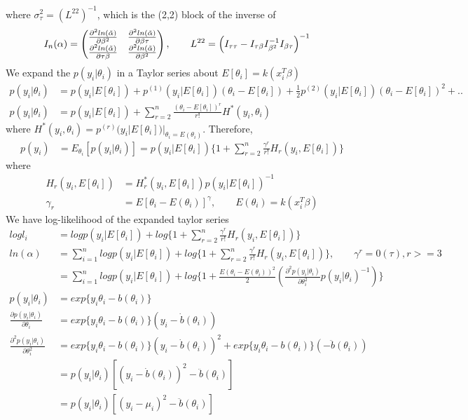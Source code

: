 \documentclass[11pt]{article} %
\begin{document}
where $\sigma^2_{\tau} = (L^{22})^{-1}$, which is the (2,2) block of the inverse of
\begin{align*}
	I_n(\alpha) &=  \begin{pmatrix}
		\frac{\partial^2 ln(\Tilde{\alpha})}{\partial \beta^2} & \frac{\partial^2 ln(\Tilde{\alpha})}{\partial \beta \tau}  \\
		\frac{\partial^2 ln(\Tilde{\alpha})}{\partial \tau \beta} & \frac{\partial^2 ln(\Tilde{\alpha})}{\partial \beta^2}  \\
	\end{pmatrix}, \qquad L^{22} =\left( I_{\tau \tau} - I_{\tau \beta} I_{\beta^2}^{-1} I_{\beta \tau}\right)^{-1}
\end{align*} 
We expand the $p(y_i|\theta_i)$ in a Taylor series about $E[\theta_i] = k(x_i^T\beta)$
\begin{align*}
	p(y_i|\theta_i)  &= p(y_i|E[\theta_i]) + p^{(1)}(y_i|E[\theta_i]) (\theta_i- E[\theta_i]) + \frac{1}{2} p^{(2)}(y_i|E[\theta_i]) (\theta_i- E[\theta_i])^2 +..\\
	p(y_i|\theta_i)  &= p(y_i|E[\theta_i]) + \sum_{r=2}^n \frac{(\theta_i- E[\theta_i])^r}{r!} H^{\ast}(y_i, \theta_i) 
\end{align*} 
where $H^{\ast}(y_i, \theta_i) = p^{(r)}(y_i|E[\theta_i])|_{\theta_i= E(\theta_i)}$.
Therefore,
\begin{align*}
	p(y_i)  &= E_{\theta_i}[p(y_i|\theta_i)] 
	= p(y_i|E[\theta_i]) \{1 + \sum_{r=2}^n \frac{\gamma^r}{r!} H_r(y_i, E[\theta_i]) \}
\end{align*} 
where 
\begin{align*}
	H_r(y_i, E[\theta_i]) & =H^{\ast}_r(y_i, E[\theta_i]) p(y_i|E[\theta_i])^{-1}\\
	\gamma_r &= E[\theta_i - E(\theta_i)]^{\gamma}, \qquad E(\theta_i) = k(x_i^T\beta)
\end{align*}
We have log-likelihood of the expanded taylor series
\begin{align*}
	log l_i & = log p(y_i|E[\theta_i]) + log  \{1 + \sum_{r=2}^n \frac{\gamma^r}{r!} H_r(y_i, E[\theta_i]) \}\\
	ln(\alpha) &= \sum_{i=1}^n log p(y_i|E[\theta_i]) + log  \{1 + \sum_{r=2}^n \frac{\gamma^r}{r!} H_r(y_i, E[\theta_i]) \}, \qquad \gamma^r = 0(\tau), r>=3\\
	&= \sum_{i=1}^n log p(y_i|E[\theta_i]) + log  \{1 + \frac{E(\theta_i-E(\theta_i))^2}{2} \left( \frac{\partial^2 p(y_i|\theta_i)}{\partial \theta_i^2} p(y_i|\theta_i)^{-1}\right)\}\\
	p(y_i|\theta_i) &= exp\{ y_i \theta_i - b(\theta_i)\}\\
	\frac{\partial p(y_i|\theta_i)}{\partial \theta_i} &= exp\{ y_i \theta_i - b(\theta_i)\} (y_i- \dot{b}(\theta_i))\\
	\frac{\partial^2 p(y_i|\theta_i)}{\partial \theta_i^2} &= exp\{ y_i \theta_i - b(\theta_i)\} (y_i- \dot{b}(\theta_i))^2 +  exp\{ y_i \theta_i - b(\theta_i)\}(-\ddot{b}(\theta_i))\\
	&= p(y_i|\theta_i) \left[(y_i- \dot{b}(\theta_i))^2 -\ddot{b}(\theta_i) \right]\\
	&= p(y_i|\theta_i) \left[(y_i- \mu_i)^2 -\ddot{b}(\theta_i) \right]
\end{align*}
\end{document}
